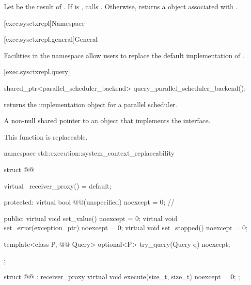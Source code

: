 \begin{itemdescr}
\pnum
\effects
Let  be the result of .
If  is ,
calls .
Otherwise, returns a  object
associated with .
\end{itemdescr}

[exec.sysctxrepl]{Namespace }

[exec.sysctxrepl.general]{General}

\pnum
Facilities in the  namespace
allow users to replace the default implementation of .

[exec.sysctxrepl.query]{}
%
\begin{itemdecl}
shared_ptr<parallel_scheduler_backend> query_parallel_scheduler_backend();
\end{itemdecl}

\begin{itemdescr}
\pnum
{} returns
the implementation object for a parallel scheduler.

\pnum
\returns
A non-null shared pointer to an object
that implements the  interface.

\pnum
\remarks
This function is replaceable.
\end{itemdescr}

\begin{codeblock}
namespace std::execution::system_context_replaceability {
  struct @@ {
    virtual ~receiver_proxy() = default;

  protected:
    virtual bool @@(unspecified) noexcept = 0;   // \expos

  public:
    virtual void set_value() noexcept = 0;
    virtual void set_error(exception_ptr) noexcept = 0;
    virtual void set_stopped() noexcept = 0;

    template<class P, @@ Query>
      optional<P> try_query(Query q) noexcept;
  };

  struct @@ : receiver_proxy {
    virtual void execute(size_t, size_t) noexcept = 0;
  };
}
\end{codeblock}

